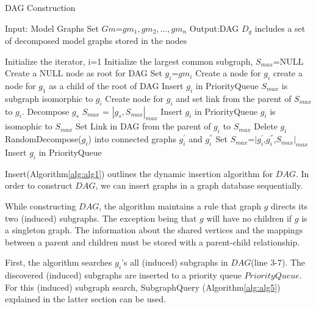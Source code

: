 \begin{algorithm}
\caption{DAG Construction}
\label{alg:alg105}
\begin{algorithmic}
\STATE Input: Model Graphs Set $Gm$=${gm_1,gm_2,\dots,gm_n}$
\STATE Output:DAG  $D_g$ includes a set of decomposed model graphs stored in the nodes
\end{algorithmic}
\begin{algorithmic}[1]
\STATE Initialize the iterator, i=1
\STATE Initialize the largest common subgraph, $S_{max}$=NULL 
\STATE Create a NULL node as root for DAG
    \STATE Set $g_i$=$gm_i$ 
    \STATE Create a node for $g_i$
    \ENDIF
        \STATE create a node for $g_1$ as a child of the root of DAG 
        \STATE Insert $g_i$ in PriorityQueue 
    \ENDIF
    \ELSE
        \STATE $S_{max}$ is subgraph isomorphic to $g_i$ 
        \STATE Create node for $g_i$ and set link from the parent of $S_{max}$ to  $g_i$.
        \STATE Decompose $g_s$
        \STATE $S_{max}$ = $|g_s,S_{max}|_{max}$
        \STATE Insert $g_i$ in PriorityQueue  
    \ENDIF
    \RETURN
    \ELSE
        \STATE $g_i$ is isomophic to  $S_{max}$ 
        \STATE Set Link in DAG from the parent of $g_i$ to  $S_{max}$ 
        \STATE Delete $g_i$
    \ENDIF
    \RETURN
    \ELSE
        \STATE RandomDecompose($g_i$) into connected graphs $g_i^{'}$ and  $g_i^{''}$
        \STATE Set $S_{max}$=$|g_i^{'}$,$g_i^{''}$,$S_{max}|_{max}$
        \STATE Insert $g_i$ in  PriorityQueue 
    \ENDIF
    \RETURN
\ENDWHILE
\end{algorithmic}
\end{algorithm}




Insert(Algorithm\ref{alg:alg1}) outlines the dynamic insertion algorithm for $DAG$. In order to construct $DAG$, we can insert graphs in a graph database 
sequentially.

While constructing $DAG$, the algorithm maintains a rule that graph $g$ directs its two (induced) subgraphs.
The exception being that $g$ will have no children if $g$ is a singleton graph.
The information about the shared vertices and the mappings between a parent and children must be stored with a parent-child relationship.

First, the algorithm searches $g_i$'s all (induced) subgraphs in $DAG$(line 3-7).
The discovered (induced) subgraphs are inserted to a priority queue $PriorityQueue$.
For this (induced) subgraph search, SubgraphQuery (Algorithm\ref{alg:alg5}) explained in the latter section can be used.

